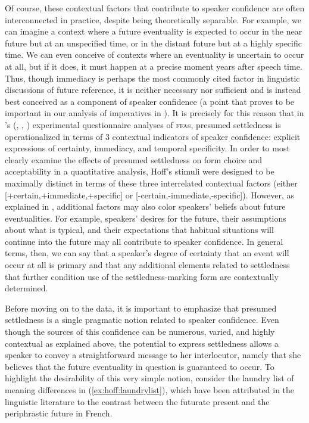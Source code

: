 \documentclass[output=paper,colorlinks,citecolor=brown]{langscibook}
\begin{document}
Of course, these contextual factors that contribute to speaker confidence are often interconnected in practice, despite being theoretically separable. For example, we can imagine a context where a future eventuality is expected to occur in the near future but at an unspecified time, or in the distant future but at a highly specific time. We can even conceive of contexts where an eventuality is uncertain to occur at all, but if it does, it must happen at a precise moment years after speech time. Thus, though immediacy is perhaps the most commonly cited factor in linguistic discussions of future reference, it is neither necessary nor sufficient and is instead best conceived as a component of speaker confidence (a point that proves to be important in our analysis of imperatives in ). It is precisely for this reason that in \citeauthor{Hoff2019}’s (\citeyear{Hoff2019}, \citeyear{Hoff2020}, \citeyear{HoffForthcoming}) experimental questionnaire analyses of \textsc{ffa}s, presumed settledness is operationalized in terms of 3 contextual indicators of speaker confidence: explicit expressions of certainty, immediacy, and temporal specificity. In order to most clearly examine the effects of presumed settledness on form choice and acceptability in a quantitative analysis, Hoff’s stimuli were designed to be maximally distinct in terms of these three interrelated contextual factors (either [+certain,+immediate,+specific] or [-certain,-immediate,-specific]). However, as explained in \citet{Hoff2019}, additional factors may also color speakers’ beliefs about future eventualities. For example, speakers’ desires for the future, their assumptions about what is typical, and their expectations that habitual situations will continue into the future may all contribute to speaker confidence. In general terms, then, we can say that a speaker's degree of certainty that an event will occur at all is primary and that any additional elements related to settledness that further condition use of the settledness-marking form are contextually determined.

Before moving on to the data, it is important to emphasize that presumed settledness is a single pragmatic notion related to speaker confidence. Even though the sources of this confidence can be numerous, varied, and highly contextual as explained above, the potential to express settledness allows a speaker to convey a straightforward message to her interlocutor, namely that she believes that the future eventuality in question is guaranteed to occur. To highlight the desirability of this very simple notion, consider the laundry list of meaning differences in (\ref{ex:hoff:laundrylist}), which have been attributed in the linguistic literature to the contrast between the futurate present and the periphrastic future in French.
\end{document}
